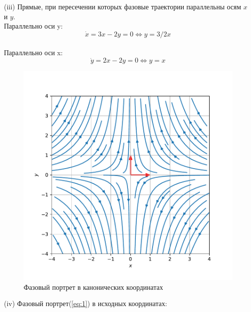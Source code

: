 \documentclass[a4paper, 12pt]{article}
\begin{document}
(iii) Прямые, при пересечении которых фазовые траектории параллельны осям $x$ и $y$.\\
Параллельно оси y:
\[\dot{x} = 3x-2y=0\Leftrightarrow y = 3/2x\]\\
Параллельно оси x:
\[\dot{y} = 2x-2y=0\Leftrightarrow y = x\]
\begin{figure}[H]
	\centering
	\includegraphics[scale=0.7]{1a1_0}
	\caption{Фазовый портрет в канонических координатах}
	\label{im:1a1_0}
\end{figure}



(iv) Фазовый портрет(\ref{eq:1}) в исходных координатах:
\end{document}
